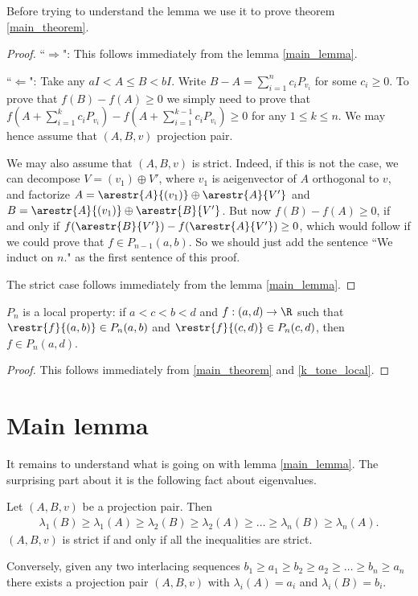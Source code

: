 Before trying to understand the lemma we use it to prove theorem \ref{main_theorem}.

\begin{proof}
	``$\Rightarrow$": This follows immediately from the lemma \ref{main_lemma}.

	``$\Leftarrow$": Take any $a I < A \leq B < b I$. Write $B - A = \sum_{i = 1}^{n} c_{i} P_{v_{i}}$ for some $c_{i} \geq 0$. To prove that $f(B) - f(A) \geq 0$ we simply need to prove that $f(A + \sum_{i = 1}^{k} c_{i} P_{v_{i}}) - f(A + \sum_{i = 1}^{k - 1} c_{i} P_{v_{i}}) \geq 0$ for any $1 \leq k \leq n$. We may hence assume that $(A, B, v)$ projection pair.

	We may also assume that $(A, B, v)$ is strict. Indeed, if this is not the case, we can decompose $V = (v_{1}) \oplus V'$, where $v_{1}$ is aeigenvector of $A$ orthogonal to $v$, and factorize $A = \arestr{A}{(v_{1})} \oplus \arestr{A}{V'}$ and $B = \arestr{A}{(v_{1})} \oplus \arestr{B}{V'}$. But now $f(B) - f(A) \geq 0$, if and only if $f(\arestr{B}{V'}) - f(\arestr{A}{V'}) \geq 0$, which would follow if we could prove that $f \in P_{n - 1}(a, b)$. So we should just add the sentence ``We induct on $n$." as the first sentence of this proof.

	The strict case follows immediately from the lemma \ref{main_lemma}.
\end{proof}

\begin{kor}
	$P_{n}$ is a local property: if $a < c < b < d$ and $f : (a, d) \to \R$ such that $\restr{f}{(a, b)} \in P_{n}(a, b)$ and $\restr{f}{(c, d)} \in P_{n}(c, d)$, then $f \in P_{n}(a, d)$.
\end{kor}
\begin{proof}
	This follows immediately from \ref{main_theorem} and \ref{k_tone_local}.
\end{proof}

\section{Main lemma}

It remains to understand what is going on with lemma \ref{main_lemma}. The surprising part about it is the following fact about eigenvalues.

\begin{lem}\label{projection_eigenvalues}
	Let $(A, B, v)$ be a projection pair. Then
	\begin{align*}
		\lambda_{1}(B) \geq \lambda_{1}(A) \geq \lambda_{2}(B) \geq \lambda_{2}(A) \geq \ldots \geq \lambda_{n}(B) \geq \lambda_{n}(A).
	\end{align*}
	$(A, B, v)$ is strict if and only if all the inequalities are strict.

	Conversely, given any two interlacing sequences $b_{1} \geq a_{1} \geq b_{2} \geq a_{2} \geq \ldots \geq b_{n} \geq a_{n}$ there exists a projection pair $(A, B, v)$ with $\lambda_{i}(A) = a_{i}$ and $\lambda_{i}(B) = b_{i}$.
\end{lem}

